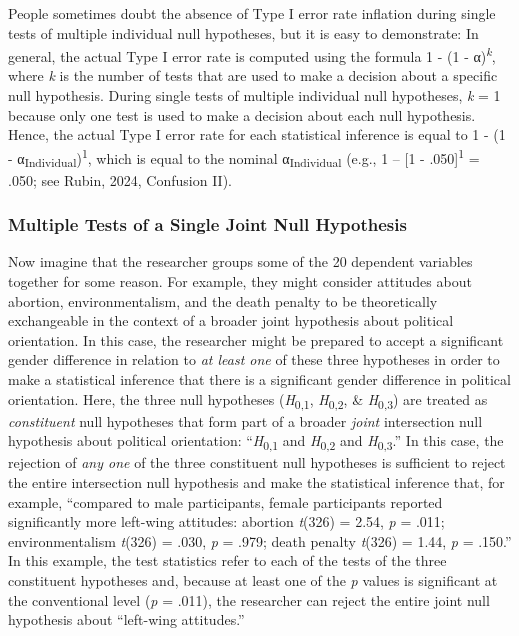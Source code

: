\documentclass[authordate, empirical]{jote-new-article}
\begin{document}
	People sometimes doubt the absence of Type I error rate inflation during single tests of multiple individual null hypotheses, but it is easy to demonstrate: In general, the actual Type I error rate is computed using the formula 1 - (1 - α)\textsuperscript{\emph{k}}, where \emph{k} is the number of tests that are used to make a decision about a specific null hypothesis. During single tests of multiple individual null hypotheses, \emph{k} = 1 because only one test is used to make a decision about each null hypothesis. Hence, the actual Type I error rate for each statistical inference is equal to 1 - (1 - α\textsubscript{Individual})\textsuperscript{1}, which is equal to the nominal α\textsubscript{Individual} (e.g., 1 -- [1 - .050]\textsuperscript{1 }= .050; see Rubin, 2024, Confusion II).



	\subsubsection{Multiple Tests of a Single Joint Null Hypothesis}



	Now imagine that the researcher groups some of the 20 dependent variables together for some reason. For example, they might consider attitudes about abortion, environmentalism, and the death penalty to be theoretically exchangeable in the context of a broader joint hypothesis about political orientation. In this case, the researcher might be prepared to accept a significant gender difference in relation to \emph{at least one} of these three hypotheses in order to make a statistical inference that there is a significant gender difference in political orientation. Here, the three null hypotheses (\emph{H}\textsubscript{0,1}, \emph{H}\textsubscript{0,2}, \& \emph{H}\textsubscript{0,3}) are treated as \emph{constituent} null hypotheses that form part of a broader \emph{joint} intersection null hypothesis about political orientation: “\emph{H}\textsubscript{0,1 }and\emph{ H}\textsubscript{0,2 }and \emph{H}\textsubscript{0,3}.” In this case, the rejection of \emph{any one }of the three constituent null hypotheses is sufficient to reject the entire intersection null hypothesis and make the statistical inference that, for example, “compared to male participants, female participants reported significantly more left-wing attitudes: abortion \emph{t}(326) = 2.54, \emph{p} = .011; environmentalism\textsubscript{ }\emph{t}(326) = .030, \emph{p} = .979; death penalty\textsubscript{ }\emph{t}(326) = 1.44, \emph{p} = .150.” In this example, the test statistics refer to each of the tests of the three constituent hypotheses and, because at least one of the \emph{p} values is significant at the conventional level (\emph{p} = .011), the researcher can reject the entire joint null hypothesis about “left-wing attitudes.”
\end{document}
